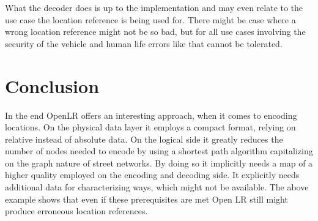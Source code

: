 What the decoder does is up to the implementation and may even relate to the use case the location reference is being used for. There might be case where a wrong location reference might not be so bad, but for all use cases involving the security of the vehicle and human life  errors like that cannot be tolerated.

\section{Conclusion}
\label{sec:conclusion}

In the end OpenLR offers an interesting approach, when it comes to encoding locations. On the physical data layer it employs a compact format, relying on relative instead of absolute data. On the logical side it greatly reduces the number of nodes needed to encode by using a shortest path algorithm capitalizing on the graph nature of street networks. By doing so it implicitly needs a map of a higher quality employed on the encoding and decoding side. It explicitly needs additional data for characterizing ways, which might not be available. The above example shows that even if these prerequisites are met Open LR still might produce erroneous location references.